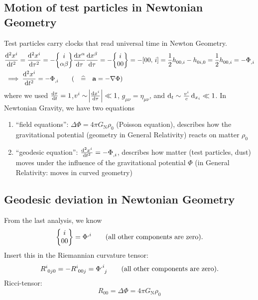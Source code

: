 \subsection{Motion of test particles in Newtonian Geometry}
Test particles carry clocks that read universal time in Newton Geometry.
\begin{align}
    & \frac{\dif{}^2 x^i}{\dif{} t^2} = \frac{\dif{}^2 x^i}{\dif{} \tau^2} 
    = - \cSym{i}{\alpha}{\beta} \frac{\dif x^\alpha}{\dif \tau} \frac{\dif x^\beta}{\dif \tau}
    = - \cSym{i}{0}{0}
    = - \csym{0}{0}{i}
    = \frac{1}{2} \tensor{h}{_0_0_,_i} - \tensor{h}{_0_i_,_0} 
    = \frac{1}{2} \tensor{h}{_0_0_,_i} = - \tensor{\Phi}{_,_i} \\
    & \implies \frac{\dif{}^2 x^i}{\dif{} t^2} =  - \tensor{\Phi}{_,_i} \qquad \left( \quad \widehat{=} \quad \vec{a} = -\nabla \Phi \right) 
\end{align}
where we used $\frac{\dif \tau}{\dif t} = 1$,$v^i \sim \abs{\frac{\dif x^i}{\dif \tau}} \ll 1$, $g_{\mu\nu}=\eta_{\mu\nu}$, and
$\dif{}_t \sim \frac{v^i}{c} \dif{}_{x_i} \ll 1$.
In Newtonian Gravity, we have two equations
\begin{enumerate}
    \item ``field equations'': $\Delta \Phi = 4 \pi G_\text{N} \rho_0$ (Poisson equation), describes how the gravitational potential
    (geometry in General Relativity) reacts on matter $\rho_0$
    \item ``geodesic equation'': $\frac{\dif{}^2 x^i}{\dif{}t^2} = - \tensor{\Phi}{_,_i}$, describes how matter (test particles, dust)
    moves under the influence of the gravitational potential $\Phi$ (in General Relativity: moves in curved geometry)
\end{enumerate}

\subsection{Geodesic deviation in Newtonian Geometry}
From the last analysis, we know
\begin{equation}
    \cSym{i}{0}{0} = \tensor{\Phi}{^,^i} \qquad \text{(all other components are zero).}
\end{equation} 
Insert this in the Riemannian curvature tensor:
\begin{equation}
    \tensor{R}{^i_0_j_0} = -\tensor{R}{^i_0_0_j} = \tensor{\Phi}{^,^i_j} \qquad \text{(all other components are zero).}
\end{equation}
Ricci-tensor: 
\begin{equation}
    R_{00} = \Delta \Phi = 4 \pi G_\text{N} \rho_0
\end{equation}

